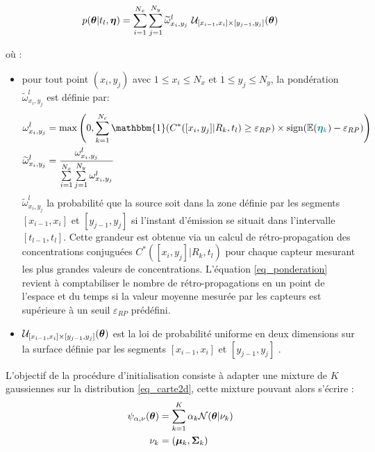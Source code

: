 \begin{equation}
p({\bm{\theta}} | t_l,{\bm{\eta}}) = \sum\limits_{i=1}^{N_x} \sum\limits_{j=1}^{N_y} \widetilde{\omega}_{x_i,y_j}^l ~  \mathcal{U}_{[x_{i-1},x_i]\times [y_{j-1},y_j]}({\bm{\theta}})
\label{eq_carte2d}
\end{equation}

où :
\begin{itemize}
	\item pour tout point $(x_i,y_j)$ avec $1\leq x_i \leq N_x$ et $1 \leq y_j \leq N_y$, la pondération $\widetilde{\omega}_{x_i,y_j}^l$ est définie par:
	\begin{equation}
		\begin{split}
			\omega_{x_i,y_j}^l &= \max\left(0, \sum\limits_{k=1}^{N_c} \mathbbm{1}(C^*([x_i,y_j] | R_k,t_l) \geq \varepsilon_{RP}) \times \text{sign}(\mathbb{E}(\NdFS{\VecObs_k}) - \varepsilon_{RP})\right) \\
			\widetilde{\omega}_{x_i,y_j}^l &= \dfrac{\omega_{x_i,y_j}^l}{\sum\limits_{i=1}^{N_x}\sum\limits_{j=1}^{N_y}\omega_{x_i,y_j}^l}
		\end{split}
		\label{eq_ponderation}
	\end{equation}
	$\widetilde{\omega}_{x_i,y_j}^l$  la probabilité que la source soit dans la zone définie par les segments $[x_{i-1},x_i]$ et $[y_{j-1},y_j]$ si l'instant d'émission se situait dans l'intervalle $[t_{l-1},t_l]$. Cette grandeur est obtenue via un calcul de rétro-propagation des concentrations conjuguées $C^*([x_i,y_j] | R_k,t_l) $ pour chaque capteur  mesurant les plus grandes valeurs de concentrations. L'équation \eqref{eq_ponderation} revient à comptabiliser le nombre de rétro-propagations en un point de l'espace et du temps si la valeur moyenne mesurée par les capteurs est supérieure à un seuil $\varepsilon_{RP}$ prédéfini. 
	\item $\mathcal{U}_{[x_{i-1},x_i]\times [y_{j-1},y_j]}({\bm{\theta}})$ est la loi de probabilité uniforme en deux dimensions sur la surface définie par les segments $[x_{i-1},x_i]$ et $[y_{j-1},y_j]$ . \\
\end{itemize}

L'objectif de la procédure d'initialisation consiste à adapter une mixture de $K$ gaussiennes sur la distribution \eqref{eq_carte2d}, cette mixture pouvant alors s'écrire : 
\begin{equation}
\begin{split}
\psi_{\alpha, \nu}({\bm{\theta}}) &= \sum\limits_{k=1}^K \alpha_k \mathcal{N}({\bm{\theta}} | \nu_k) \\
\nu_k &= ({\bm{\mu}}_k, {\bm{\Sigma}}_k)
\end{split}
\end{equation}

